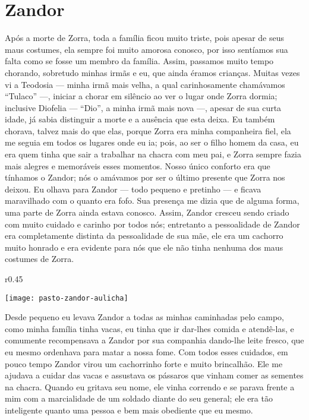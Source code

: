 \cleardoublepage
\newpage
\ifdefined\EnableIncludeImages
\fi
\chapter{Zandor}

Após a morte de Zorra, toda a família ficou muito triste, pois apesar de seus maus costumes, ela sempre foi muito amorosa conosco, por isso sentíamos sua falta como se fosse um membro da família. 
Assim, passamos muito tempo chorando, sobretudo minhas irmãs e eu, que ainda éramos crianças. 
Muitas vezes vi a Teodosia ---  minha irmã mais velha, a qual carinhosamente chamávamos ``Tulaco'' ---, iniciar a chorar em silêncio ao ver o lugar onde Zorra dormia; inclusive Diofelia  --- ``Dio'', a minha irmã mais nova ---, apesar de sua curta idade, já sabia distinguir a morte e a ausência que esta deixa. 
Eu também chorava, talvez mais do que elas, porque Zorra era minha companheira fiel, ela me seguia em todos os lugares onde eu ia; pois, ao ser o filho homem da casa, eu era quem tinha que sair a trabalhar na chacra com meu pai, e Zorra sempre fazia mais alegres e memoráveis esses momentos.
Nosso único conforto era que tínhamos o Zandor; nós o amávamos por ser o último presente que Zorra nos deixou.
Eu olhava para Zandor --- todo pequeno e pretinho --- e ficava maravilhado com o quanto era fofo. Sua presença me dizia que de alguma forma, uma parte de Zorra ainda estava conosco. 
Assim, Zandor cresceu sendo criado com muito cuidado e carinho por todos nós;
entretanto a pessoalidade de Zandor era completamente distinta da pessoalidade de sua mãe, ele era um cachorro muito honrado e era evidente para nós que ele não tinha nenhuma dos maus costumes de Zorra. 
\ifdefined\EnableIncludeImages
\begin{wrapfigure}{r}{0.45\textwidth}
  \begin{center}
  \vspace{-20pt}
    \texttt{[image: pasto-zandor-aulicha]}
  \end{center}
  \vspace{-20pt}
\end{wrapfigure}
\fi
Desde pequeno eu levava Zandor a todas as minhas caminhadas pelo campo, como minha família tinha vacas, eu tinha que ir dar-lhes comida e atendê-las, e comumente recompensava a Zandor por sua companhia dando-lhe leite fresco, que eu mesmo ordenhava para matar a nossa fome. 
Com todos esses cuidados, em pouco tempo Zandor virou um cachorrinho forte e muito brincalhão.
Ele me ajudava a cuidar das vacas e assustava os pássaros que vinham comer as sementes na chacra. Quando eu gritava seu nome, ele vinha correndo e se parava frente a mim com a marcialidade de um soldado diante do seu general; ele era tão inteligente quanto uma pessoa e bem mais obediente que eu mesmo.

